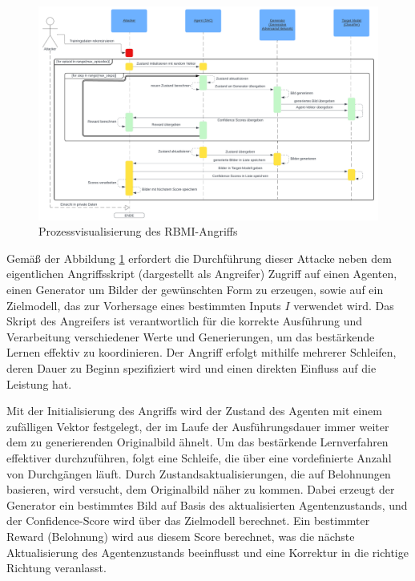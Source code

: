 \begin{figure}
	\centering
	\includegraphics[width=\linewidth]{Bilder/RBMI_PROCESS.png}
	\caption{Prozessvisualisierung des RBMI-Angriffs}
	\label{img:rbmi_process}
\end{figure}

Gemäß der Abbildung \ref{img:rbmi_process} erfordert die Durchführung dieser Attacke neben dem eigentlichen Angriffsskript (dargestellt als Angreifer) Zugriff auf einen Agenten, einen Generator um Bilder der gewünschten Form zu erzeugen, sowie auf ein Zielmodell, das zur Vorhersage eines bestimmten Inputs $I$ verwendet wird. Das Skript des Angreifers ist verantwortlich für die korrekte Ausführung und Verarbeitung verschiedener Werte und Generierungen, um das bestärkende Lernen effektiv zu koordinieren. Der Angriff erfolgt mithilfe mehrerer Schleifen, deren Dauer zu Beginn spezifiziert wird und einen direkten Einfluss auf die Leistung hat.

Mit der Initialisierung des Angriffs wird der Zustand des Agenten mit einem zufälligen Vektor festgelegt, der im Laufe der Ausführungsdauer immer weiter dem zu generierenden Originalbild ähnelt. Um das bestärkende Lernverfahren effektiver durchzuführen, folgt eine Schleife, die über eine vordefinierte Anzahl von Durchgängen läuft. Durch Zustandsaktualisierungen, die auf Belohnungen basieren, wird versucht, dem Originalbild näher zu kommen. Dabei erzeugt der Generator ein bestimmtes Bild auf Basis des aktualisierten Agentenzustands, und der Confidence-Score wird über das Zielmodell berechnet. Ein bestimmter Reward (Belohnung) wird aus diesem Score berechnet, was die nächste Aktualisierung des Agentenzustands beeinflusst und eine Korrektur \glqq in die richtige Richtung\grqq{} veranlasst.

